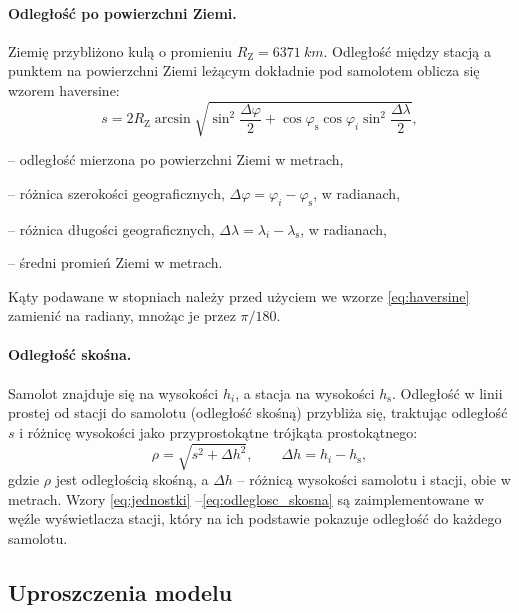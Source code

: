 \paragraph{Odległość po powierzchni Ziemi.}
Ziemię przybliżono kulą o promieniu $R_{\mathrm{Z}} = \SI{6371}{km}$.
Odległość między stacją a punktem na powierzchni Ziemi leżącym dokładnie pod
samolotem oblicza się wzorem haversine:
\begin{equation}
  s = 2 R_{\mathrm{Z}} \arcsin \sqrt{
        \sin^2\frac{\Delta\varphi}{2}
        + \cos\varphi_{\mathrm{s}} \cos\varphi_i
          \sin^2\frac{\Delta\lambda}{2}},
  \label{eq:haversine}
\end{equation}
\begin{objasnienia}
  \item[$s$] -- odległość mierzona po powierzchni Ziemi w metrach,
  \item[$\Delta\varphi$] -- różnica szerokości geograficznych, $\Delta\varphi = \varphi_i - \varphi_{\mathrm{s}}$, w radianach,
  \item[$\Delta\lambda$] -- różnica długości geograficznych, $\Delta\lambda = \lambda_i - \lambda_{\mathrm{s}}$, w radianach,
  \item[$R_{\mathrm{Z}}$] -- średni promień Ziemi w metrach.
\end{objasnienia}
Kąty podawane w stopniach należy przed użyciem we wzorze
\eqref{eq:haversine} zamienić na radiany, mnożąc je przez $\pi/180$.

\paragraph{Odległość skośna.}
Samolot znajduje się na wysokości $h_i$, a stacja na wysokości
$h_{\mathrm{s}}$. Odległość w linii prostej od stacji do samolotu
(odległość skośną) przybliża się, traktując odległość $s$ i różnicę wysokości
jako przyprostokątne trójkąta prostokątnego:
\begin{equation}
  \rho = \sqrt{s^2 + \Delta h^2}, \qquad \Delta h = h_i - h_{\mathrm{s}},
  \label{eq:odleglosc_skosna}
\end{equation}
gdzie $\rho$ jest odległością skośną, a $\Delta h$ -- różnicą wysokości
samolotu i stacji, obie w metrach. Wzory \eqref{eq:jednostki}%
--\eqref{eq:odleglosc_skosna} są zaimplementowane w węźle wyświetlacza
stacji, który na ich podstawie pokazuje odległość do każdego samolotu.

\subsection{Uproszczenia modelu}
\label{sec:model_uproszczenia}

